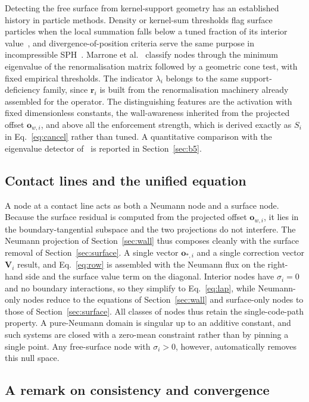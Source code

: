 \documentclass[preprint,review,12pt]{elsarticle}
\newcommand{\ow}{\mathbf{o}_{w,i}}
\newcommand{\ri}{\mathbf{r}_i}
\newcommand{\Vi}{\mathbf{V}_i}
\begin{document}
Detecting the free surface from kernel-support geometry has an established history in particle methods.
Density or kernel-sum thresholds flag surface particles when the local summation falls below a tuned fraction of its interior value~\cite{Koshizuka1998,Doring2005}, and divergence-of-position criteria serve the same purpose in incompressible SPH~\cite{Lee2008}.
Marrone et al.~\cite{Marrone2010} classify nodes through the minimum eigenvalue of the renormalisation matrix followed by a geometric cone test, with fixed empirical thresholds.
The indicator $\lambda_i$ belongs to the same support-deficiency family, since $\ri$ is built from the renormalisation machinery already assembled for the operator.
The distinguishing features are the activation with fixed dimensionless constants, the wall-awareness inherited from the projected offset $\ow$, and above all the enforcement strength, which is derived exactly as $S_i$ in Eq.~\eqref{eq:cancel} rather than tuned.
A quantitative comparison with the eigenvalue detector of~\cite{Marrone2010} is reported in Section~\ref{sec:b5}.

\subsection{Contact lines and the unified equation}
\label{sec:unified}

A node at a contact line acts as both a Neumann node and a surface node.
Because the surface residual is computed from the projected offset $\ow$, it lies in the boundary-tangential subspace and the two projections do not interfere.
The Neumann projection of Section~\ref{sec:wall} thus composes cleanly with the surface removal of Section~\ref{sec:surface}.
A single vector $\mathbf o_{*,i}$ and a single correction vector $\Vi$ result, and Eq.~\eqref{eq:row} is assembled with the Neumann flux on the right-hand side and the surface value term on the diagonal.
Interior nodes have $\sigma_i=0$ and no boundary interactions, so they simplify to Eq.~\eqref{eq:lap}, while Neumann-only nodes reduce to the equations of Section~\ref{sec:wall} and surface-only nodes to those of Section~\ref{sec:surface}.
All classes of nodes thus retain the single-code-path property.
A pure-Neumann domain is singular up to an additive constant, and such systems are closed with a zero-mean constraint rather than by pinning a single point.
Any free-surface node with $\sigma_i>0$, however, automatically removes this null space.

\subsection{A remark on consistency and convergence}
\label{sec:remark}
\end{document}
